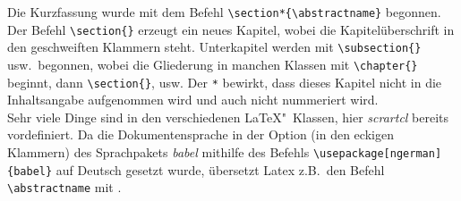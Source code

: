 Die Kurzfassung wurde mit dem Befehl \verb"\section*{\abstractname}" begonnen. Der Befehl \verb"\section{}" erzeugt ein neues Kapitel, wobei die Kapitelüberschrift in den geschweiften Klammern steht. Unterkapitel werden mit \verb"\subsection{}" usw.\ begonnen, wobei die Gliederung in manchen Klassen mit \verb"\chapter{}" beginnt, dann \verb"\section{}", usw.  Der \verb"*" bewirkt, dass dieses Kapitel nicht in die Inhaltsangabe aufgenommen wird und auch nicht nummeriert wird.\\
Sehr viele Dinge sind in den verschiedenen \LaTeX"~Klassen, hier \textit{scrartcl} bereits vordefiniert. Da die Dokumentensprache in der Option (in den eckigen Klammern) des Sprachpakets \textit{babel} mithilfe des Befehls \verb"\usepackage[ngerman]{babel}" auf Deutsch gesetzt wurde, übersetzt Latex z.B.\ den Befehl \verb"\abstractname" mit \abstractname.
%
